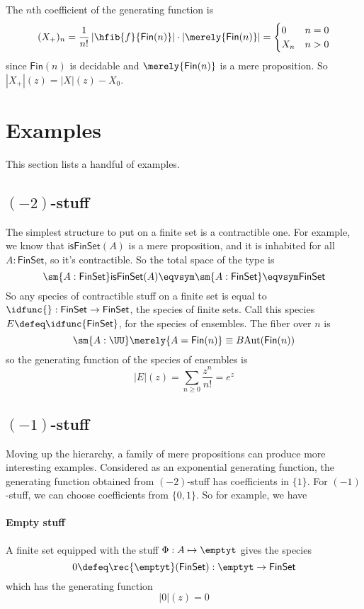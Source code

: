 \documentclass[fleqn]{article}
\newcommand{\gf}[1]{\abs{#1}\!(z)}
\newcommand{\fin}{\mathsf{Fin}}
\newcommand{\finset}{\mathsf{FinSet}}
\newcommand{\isfinset}{\mathsf{isFinSet}}
\newcommand{\abs}[1]{\left\lvert #1 \right\rvert}
\newcommand{\Aut}{\mathrm{Aut}}
\theoremstyle{theorem}
\theoremstyle{definition}
\begin{document}
The $n$th coefficient of the generating function is
\[
  (X_{+})_{n}
  =
  \frac{1}{n!}\abs{\hfib{f}{\fin(n)}} \cdot \abs{\merely{\fin(n)}}
  =
  \begin{cases}
    0 & n = 0 \\
    X_{n} & n > 0
  \end{cases}
\]
since $\fin(n)$ is decidable and $\merely{\fin(n)}$ is a mere proposition.  So
$\gf{X_{+}} = \gf{X} - X_{0}$.


\section{Examples}
This section lists a handful of examples.  

\subsection{$(-2)$-stuff}  The simplest structure to put on a finite set is a
contractible one.  For example, we know that $\isfinset(A)$ is a mere 
proposition, and it is inhabited for all $A : \finset$, so it's contractible.
So the total space of the type is
\[
  \sm{A : \finset}\isfinset(A)
  \eqvsym
  \sm{A : \finset}\unit
  \eqvsym
  \finset
\]
So any species of contractible stuff on a finite set is equal to $\idfunc{} :
\finset \to \finset$, the species of finite sets.  Call this species $E \defeq
\idfunc{\finset}$, for the species of ensembles.
The fiber over $n$ is
\[
  \sm{A : \UU}\merely{A = \fin(n)} \equiv B\Aut(\fin(n))
\]
so the generating function of the species of ensembles is
\[
  \gf{E} = \sum_{n\geq0} \frac{z^{n}}{n!} = e^{z}
\]


\subsection{$(-1)$-stuff}  Moving up the hierarchy, a family of mere
propositions can produce more interesting examples.  Considered as an
exponential generating function, the generating function obtained from
$(-2)$-stuff has coefficients in $\{1\}$.  For $(-1)$-stuff, we can choose
coefficients from $\{0, 1\}$.  So for example, we have

\paragraph{Empty stuff}
A finite set equipped with the stuff $\Phi : A \mapsto \emptyt$ gives the
species
\[
  0 \defeq \rec{\emptyt}(\finset) : \emptyt \to \finset
\]
which has the generating function
\[
  \gf{0} = 0
\]
\end{document}
